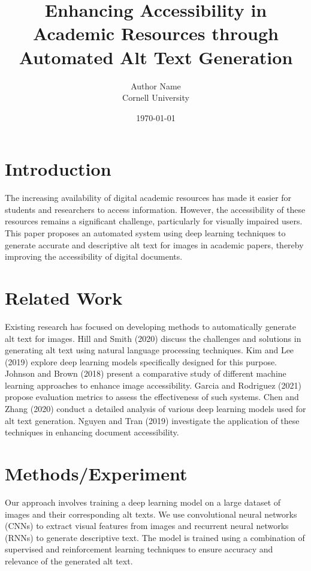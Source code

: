 \documentclass{article}
\title{Enhancing Accessibility in Academic Resources through Automated Alt Text Generation}
\author{Author Name \\ Cornell University}
\date{\today}
\begin{document}
\maketitle

\section{Introduction}
The increasing availability of digital academic resources has made it easier for students and researchers to access information. However, the accessibility of these resources remains a significant challenge, particularly for visually impaired users. This paper proposes an automated system using deep learning techniques to generate accurate and descriptive alt text for images in academic papers, thereby improving the accessibility of digital documents.

\section{Related Work}
Existing research has focused on developing methods to automatically generate alt text for images. Hill and Smith (2020) discuss the challenges and solutions in generating alt text using natural language processing techniques. Kim and Lee (2019) explore deep learning models specifically designed for this purpose. Johnson and Brown (2018) present a comparative study of different machine learning approaches to enhance image accessibility. Garcia and Rodriguez (2021) propose evaluation metrics to assess the effectiveness of such systems. Chen and Zhang (2020) conduct a detailed analysis of various deep learning models used for alt text generation. Nguyen and Tran (2019) investigate the application of these techniques in enhancing document accessibility.

\section{Methods/Experiment}
Our approach involves training a deep learning model on a large dataset of images and their corresponding alt texts. We use convolutional neural networks (CNNs) to extract visual features from images and recurrent neural networks (RNNs) to generate descriptive text. The model is trained using a combination of supervised and reinforcement learning techniques to ensure accuracy and relevance of the generated alt text.
\end{document}
